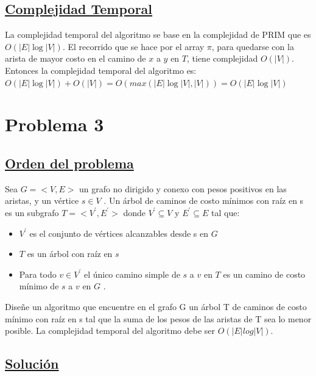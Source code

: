 \documentclass{article}
\begin{document}
    \subsection{\underline{Complejidad Temporal}}
    La complejidad temporal del algoritmo se base en la complejidad de PRIM que es $O(|E|\log{|V|})$. El recorrido 
    que se hace por el array $\pi$, para quedarse con la arista de mayor costo en el camino de $x$ a $y$ en $T$, tiene complejidad $ O(|V|)$. 
    Entonces la complejidad temporal del algoritmo es:\\ $O(|E|\log{|V|}) + O(|V|) = O(max(|E|\log{|V|}, |V|)) = O(|E|\log{|V|})$

    \newpage 


    \section{Problema 3} 

    \subsection{\underline{Orden del problema}} 

    Sea $G = <V,E>$ un grafo no dirigido y conexo con pesos positivos en las aristas, y un v\'ertice $s \in V$ . Un \'arbol de 
    caminos de costo m\'inimos con ra\'iz en s es un subgrafo $T = <V^{'} , E^{'}> $ donde $V^{'} \subseteq  V $     y $E^{'} \subseteq  E $ tal que: 
    
    \begin{itemize}
        \item $V^{'}$ es el conjunto de v\'ertices alcanzables desde s en $G$
        \item $T$ es un \'arbol con ra\'iz en $s$
        \item Para todo $v \in V^{'}$ el \'unico camino simple de $s$ a $v$ en $T$ es un camino de costo m\'inimo de $s$ a $v$ en $G$ .
    \end{itemize}

    \noindent Dise\~ne un algoritmo que encuentre en el grafo G un \'arbol T de caminos de costo m\'inimo con ra\'iz en s tal que
    la suma de los pesos de las aristas de T sea lo menor posible. La complejidad temporal del algoritmo debe ser
    $O(|E|log|V|)$.


    \subsection{\underline{Soluci\'on }}
\end{document}
